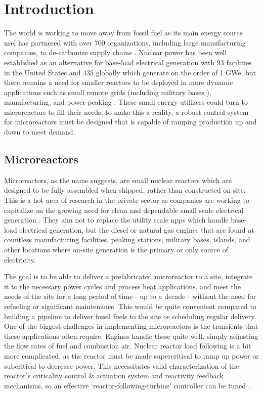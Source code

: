 \chapter{Introduction}
\label{Chapter:Introduction}
The world is working to move away from fossil fuel as its main energy source \cite{ValluriPHD}. \acf{nrel} has partnered with over 700 organizations, including large manufacturing companies, to de-carbonize supply chains \cite{NREL-partner}. Nuclear power has been well established as an alternative for base-load electrical generation with 93 facilities in the United States and 435 globally which generate on the order of 1 GWe, but there remains a need for smaller reactors to be deployed in more dynamic applications such as small remote grids (including military bases \cite{AirForce}), manufacturing, and power-peaking \cite{DoD-remote}. These small energy utilizers could turn to microreactors to fill their needs; to make this a reality, a robust control system for microreactors must be designed that is capable of ramping production up and down to meet demand.

\section{Microreactors}
Microreactors, as the name suggests, are small nuclear reactors which are designed to be fully assembled when shipped, rather than constructed on site. This is a hot area of research in the private sector as companies are working to capitalize on the growing need for clean and dependable small scale electrical generation \cite{PetersonMS}. They aim not to replace the utility scale \acfp{npp} which handle base-load electrical generation, but the diesel or natural gas engines that are found at countless manufacturing facilities, peaking stations, military bases, islands, and other locations where on-site generation is the primary or only source of electricity. 

The goal is to be able to deliver a prefabricated microreactor to a site, integrate it to the necessary power cycles and process heat applications, and meet the needs of the site for a long period of time - up to a decade - without the need for refueling or significant maintenance. This would be quite convenient compared to building a pipeline to deliver fossil fuels to the site or scheduling regular delivery. One of the biggest challenges in implementing microreactors is the transients that these applications often require. Engines handle these quite well, simply adjusting the flow rates of fuel and combustion air. Nuclear reactor load following is a bit more complicated, as the reactor must be made supercritical to ramp up power or subcritical to decrease power. This necessitates valid characterization of the reactor's criticality control \& actuation system and reactivity feedback mechanisms, so an effective `reactor-following-turbine' controller can be tuned \cite[Ch. 8]{Kerlin}.

